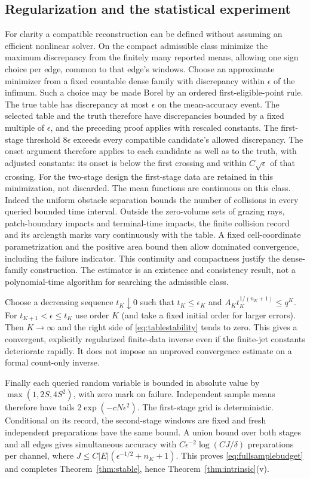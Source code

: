 \subsection{Regularization and the statistical experiment}
For clarity a compatible reconstruction can be defined without assuming
an efficient nonlinear solver. On the compact admissible class minimize
the maximum discrepancy from the finitely many reported means, allowing
one sign choice per edge, common to that edge's windows. Choose an
approximate minimizer from a fixed countable dense family with discrepancy
within $\epsilon$ of the infimum. Such a choice may be made Borel by
an ordered first-eligible-point rule. The true table has discrepancy at
most $\epsilon$ on the mean-accuracy event. The selected table and
the truth therefore have discrepancies bounded by a fixed multiple of
$\epsilon$, and the preceding proof applies with rescaled constants.
The first-stage threshold $8\epsilon$ exceeds every compatible
candidate's allowed discrepancy. The onset argument therefore applies
to each candidate as well as to the truth, with adjusted constants:
its onset is below the first crossing and within $C\sqrt\epsilon$
of that crossing. For the two-stage design the first-stage
data are retained in this minimization, not discarded. The mean functions are continuous on this class. Indeed the uniform
obstacle separation bounds the number of collisions in every queried
bounded time interval. Outside the zero-volume sets of grazing rays,
patch-boundary impacts and terminal-time impacts, the finite collision
record and its arclength marks vary continuously with the table.
A fixed cell-coordinate parametrization and the positive area bound
then allow dominated convergence, including the failure indicator.
This continuity and compactness justify the dense-family construction.
The estimator is an existence and consistency result, not a polynomial-time
algorithm for searching the admissible class.

Choose a decreasing sequence $t_K\downarrow0$ such that
$t_K\le\epsilon_K$ and $A_K t_K^{1/(n_K+1)}\le q^K$.
For $t_{K+1}<\epsilon\le t_K$ use order $K$ (and take a fixed
initial order for larger errors). Then $K\to\infty$ and the right
side of \eqref{eq:tablestability} tends to zero. This gives a
convergent, explicitly regularized finite-data inverse even if the
finite-jet constants deteriorate rapidly. It does not impose an
unproved convergence estimate on a formal count-only inverse.

Finally each queried random variable is bounded in absolute value by
$\max(1,2S,4S^2)$, with zero mark on failure. Independent sample means
therefore have tails $2\exp(-cN\epsilon^2)$. The first-stage grid is
deterministic. Conditional on its record, the second-stage windows are
fixed and fresh independent preparations have the same bound. A union
bound over both stages and all edges gives simultaneous accuracy with
$C\epsilon^{-2}\log(CJ/\delta)$ preparations per channel, where
$J\le C|E|(\epsilon^{-1/2}+n_K+1)$. This proves
\eqref{eq:fullsamplebudget} and completes Theorem~\ref{thm:stable}, hence
Theorem~\ref{thm:intrinsic}(v).

